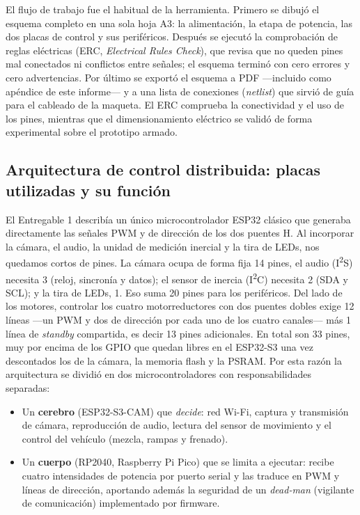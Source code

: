 \documentclass[journal]{IEEEtran}
\begin{document}
El flujo de trabajo fue el habitual de la herramienta. Primero se dibujó el esquema completo en una sola hoja A3: la alimentación, la etapa de potencia, las dos placas de control y sus periféricos. Después se ejecutó la comprobación de reglas eléctricas (ERC, \emph{Electrical Rules Check}), que revisa que no queden pines mal conectados ni conflictos entre señales; el esquema terminó con cero errores y cero advertencias. Por último se exportó el esquema a PDF ---incluido como apéndice de este informe--- y a una lista de conexiones (\emph{netlist}) que sirvió de guía para el cableado de la maqueta. El ERC comprueba la conectividad y el uso de los pines, mientras que el dimensionamiento eléctrico se validó de forma experimental sobre el prototipo armado.

\subsection{Arquitectura de control distribuida: placas utilizadas y su función}

El Entregable 1 describía un único microcontrolador ESP32 clásico que generaba directamente las señales PWM y de dirección de los dos puentes H. Al incorporar la cámara, el audio, la unidad de medición inercial y la tira de LEDs, nos quedamos cortos de pines. La cámara ocupa de forma fija 14 pines, el audio (I\textsuperscript{2}S) necesita 3 (reloj, sincronía y datos); el sensor de inercia (I\textsuperscript{2}C) necesita 2 (SDA y SCL); y la tira de LEDs, 1. Eso suma 20 pines para los periféricos. Del lado de los motores, controlar los cuatro motorreductores con dos puentes dobles exige 12 líneas ---un PWM y dos de dirección por cada uno de los cuatro canales--- más 1 línea de \emph{standby} compartida, es decir 13 pines adicionales. En total son 33 pines, muy por encima de los GPIO que quedan libres en el ESP32-S3 una vez descontados los de la cámara, la memoria flash y la PSRAM. Por esta razón la arquitectura se dividió en dos microcontroladores con responsabilidades separadas:

\begin{itemize}
\item Un \textbf{cerebro} (ESP32-S3-CAM) que \emph{decide}: red Wi-Fi, captura y transmisión de cámara, reproducción de audio, lectura del sensor de movimiento y el control del vehículo (mezcla, rampas y frenado).
\item Un \textbf{cuerpo} (RP2040, Raspberry Pi Pico) que se limita a ejecutar: recibe cuatro intensidades de potencia por puerto serial y las traduce en PWM y líneas de dirección, aportando además la seguridad de un \emph{dead-man} (vigilante de comunicación) implementado por firmware.
\end{itemize}
\end{document}
